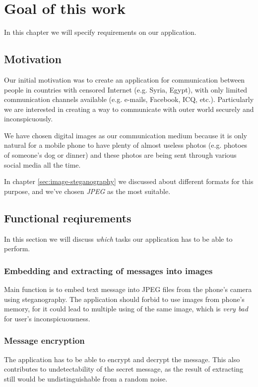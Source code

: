 \chapter{Goal of this work}

In this chapter we will specify requirements on our application.

\section{Motivation}

Our initial motivation was to create an application for communication between
people in countries with censored Internet (e.g. Syria, Egypt), with only limited communication channels
available (e.g. e-mails, Facebook, ICQ, etc.). Particularly we are interested in
creating a way to communicate with outer world securely and inconspicuously.

We have chosen digital images as our communication medium because it is only natural for
a mobile phone to have plenty of almost useless photos (e.g. photoes of someone's dog or dinner)
and these photos are being sent through various social media all the time.

In chapter \ref{sec:image-steganography} we discussed about different formats for
this purpose, and we've chosen \emph{JPEG} as the most suitable.

\section{Functional reqiurements}
In this section we will discuss \emph{which} tasks our application has to be able to perform.

\subsection{Embedding and extracting of messages into images}
Main function is to embed text message into JPEG files from the phone's camera using steganography.
The application should forbid to use images from phone's memory, for it could lead to multiple 
using of the same image, which is \emph{very bad} for user's inconspicuousness.

\subsection{Message encryption}
The application has to be able to encrypt and decrypt the message. This also contributes
to undetectability of the secret message, as the result of extracting still would be 
undistinguishable from a random noise.

